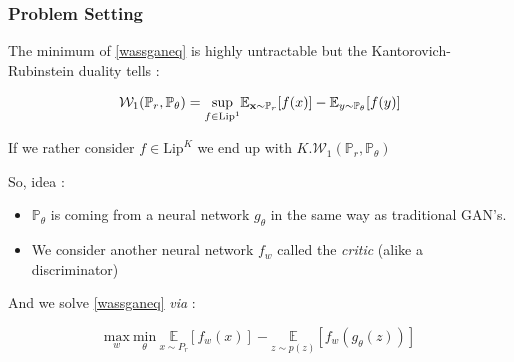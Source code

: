 \documentclass[french,9pt]{beamer}
\newcommand{\x}{{\bf x}}
\begin{document}
\begin{frame}
\frametitle{Problem Setting \cite{arjovsky_wgan_2017}}

The minimum of \eqref{wassganeq} is highly untractable but the Kantorovich-Rubinstein duality tells :

$$\mathcal{W}_{1}(\mathbb{P}_{r},\mathbb{P}_{\theta})= \underset{f \in \text{Lip}^1}\sup  \mathbb{E}_{\x\sim  \mathbb{P}_{r}} [f(x)] - \mathbb{E}_{y \sim \mathbb{P}_{\theta} } [f(y)]$$

If we rather consider $f \in \text{Lip}^K$ we end up with $K.\mathcal{W}_{1}(\mathbb{P}_{r},\mathbb{P}_{\theta})$

So, idea :

\begin{itemize}
\item $\mathbb{P}_{\theta}$ is coming from a neural network $g_{\theta}$ in the same way as traditional GAN's.
\item We consider another neural network $f_{w}$ called the \emph{critic} (alike a discriminator)
\end{itemize}

And we solve \eqref{wassganeq} \textit{via} :

\begin{equation}
\label{wassgan}
\underset{w}{\text{max}} \ \underset{\theta}{\text{min}} \  \underset{x \sim P_{r}}{\mathbb{E}}[f_{w}(x)]-\underset{z \sim p(z)}{\mathbb{E}}[f_{w}(g_{\theta}(z))]
\end{equation}

\end{frame}

\end{document}
